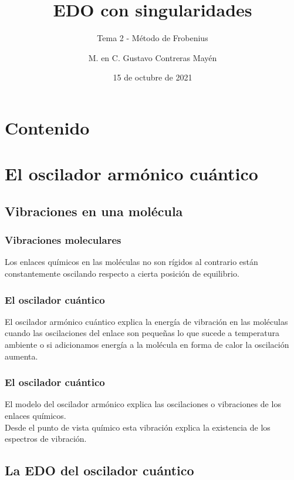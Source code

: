 \documentclass[12pt]{beamer}
\date{15 de octubre de 2021}
\title{\large{EDO con singularidades}}
\subtitle{Tema 2 - Método de Frobenius}
\author{M. en C. Gustavo Contreras Mayén}
\begin{document}
\maketitle
\fontsize{14}{14}\selectfont
{}

\section*{Contenido}

\section{El oscilador armónico cuántico}
\subsection{Vibraciones en una molécula}

\begin{frame}
\frametitle{Vibraciones moleculares}
Los enlaces químicos en las moléculas no son rígidos al contrario están constantemente oscilando respecto a cierta posición de equilibrio.
\end{frame}
\begin{frame}
\frametitle{El oscilador cuántico}
El oscilador armónico cuántico explica la energía de vibración en las moléculas cuando las oscilaciones del enlace son pequeñas lo que sucede a temperatura ambiente o si adicionamos energía a la molécula en forma de calor la oscilación aumenta.
\end{frame}
\begin{frame}
\frametitle{El oscilador cuántico}
El modelo del oscilador armónico explica las oscilaciones o vibraciones de los enlaces químicos.
\\
\bigskip
\pause
Desde el punto de vista químico esta vibración explica la existencia de los espectros de vibración.
\end{frame}

\subsection{La EDO del oscilador cuántico}
\end{document}
